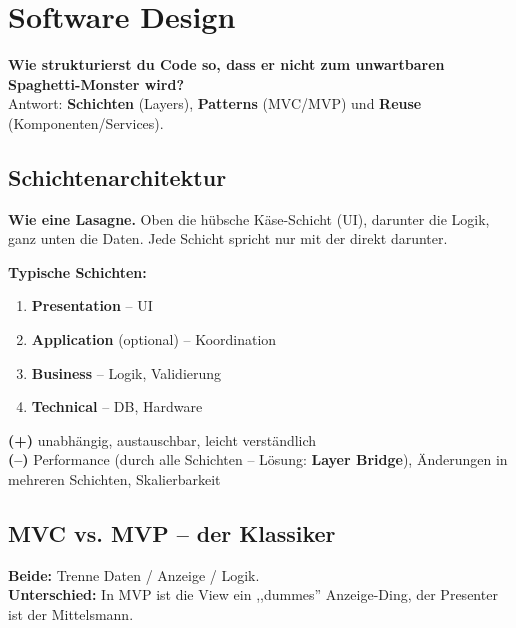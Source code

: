 \documentclass[11pt,a4paper]{article}
\begin{document}
\newpage
\section{Software Design}

\begin{tldr}
\textbf{Wie strukturierst du Code so, dass er nicht zum unwartbaren Spaghetti-Monster wird?}\\
Antwort: \textbf{Schichten} (Layers), \textbf{Patterns} (MVC/MVP) und \textbf{Reuse} (Komponenten/Services).
\end{tldr}

\subsection{Schichtenarchitektur}

\begin{story}
\textbf{Wie eine Lasagne.} Oben die hübsche Käse-Schicht (UI), darunter die Logik, ganz unten die Daten. Jede Schicht spricht nur mit der direkt darunter.
\end{story}

\begin{keyfacts}
\textbf{Typische Schichten:}
\begin{enumerate}
  \item \textbf{Presentation} -- UI
  \item \textbf{Application} (optional) -- Koordination
  \item \textbf{Business} -- Logik, Validierung
  \item \textbf{Technical} -- DB, Hardware
\end{enumerate}
\textbf{(+)} unabhängig, austauschbar, leicht verständlich\\
\textbf{(--)} Performance (durch alle Schichten -- Lösung: \textbf{Layer Bridge}), Änderungen in mehreren Schichten, Skalierbarkeit
\end{keyfacts}

\subsection{MVC vs. MVP -- der Klassiker}

\begin{story}
\textbf{Beide:} Trenne Daten / Anzeige / Logik.\\
\textbf{Unterschied:} In MVP ist die View ein ,,dummes'' Anzeige-Ding, der Presenter ist der Mittelsmann.
\end{story}
\end{document}
